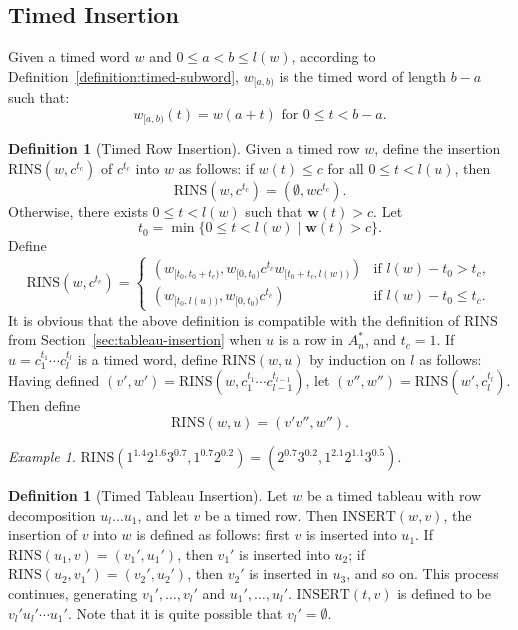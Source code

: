 \documentclass[10pt]{amsproc}
\theoremstyle{definition}
\newtheorem{definition}[theorem]{Definition}
\theoremstyle{remark}
\newtheorem{example}[theorem]{Example}
\newcommand{\rowins}{\mathrm{RINS}}
\newcommand{\ins}{\mathrm{INSERT}}
\begin{document}
\subsection{Timed Insertion}
\label{sec:timed-insertion}
Given a timed word $w$ and $0\leq a < b \leq l(w)$, according to Definition~\ref{definition:timed-subword}, $w_{[a, b)}$ is the timed word of length $b-a$ such that:
\begin{displaymath}
  w_{[a, b)}(t) = w(a+ t) \text{ for } 0\leq t<b-a.
\end{displaymath}
\begin{definition}[Timed Row Insertion]
  \label{definition:timed-row-insertion}
  Given a timed row $w$, define the insertion $\rowins(w, c^{t_c})$ of $c^{t_c}$ into $w$ as follows: if $w(t)\leq c$ for all $0\leq t < l(u)$, then
  \begin{displaymath}
    \rowins(w, c^{t_c}) = (\emptyset, wc^{t_c}).
  \end{displaymath}
  Otherwise, there exists $0\leq t < l(w)$ such that $\mathbf w(t)>c$.
  Let
  \begin{displaymath}
    t_0 = \min\{0\leq t< l(w)\mid \mathbf w(t)> c\}.
  \end{displaymath}
  Define
  \begin{displaymath}
    \rowins(w, c^{t_c}) =
    \begin{cases}
      (w_{[t_0, t_0+t_c)}, w_{[0, t_0)}c^{t_c} w_{[t_0+t_c, l(w))}) & \text{if } l(w) - t_0 > t_c,\\
      (w_{[t_0, l(u))}, w_{[0, t_0)} c^{t_c}) & \text{if } l(w) - t_0 \leq t_c.
    \end{cases}
  \end{displaymath}
  It is obvious that the above definition is compatible with the definition of $\rowins$ from Section~\ref{sec:tableau-insertion} when $u$ is a row in $A_n^*$, and $t_c=1$.
  If $u=c_1^{t_1}\dotsb c_l^{t_l}$ is a timed word, define $\rowins(w,u)$ by induction on $l$ as follows:
  Having defined $(v',w')=\rowins(w,c_1^{t_1}\dotsb c_{l-1}^{t_{l-1}})$,
  let $(v'',w'')=\rowins(w',c_l^{t_l})$.
  Then define
  \begin{displaymath}
    \rowins(w,u) = (v'v'', w'').
  \end{displaymath}
\end{definition}
\begin{example}
  \label{example:timed-row-ins}
  $\rowins(1^{1.4}2^{1.6}3^{0.7},1^{0.7}2^{0.2})=(2^{0.7}3^{0.2},1^{2.1}2^{1.1}3^{0.5})$.
\end{example}
\begin{definition}
  [Timed Tableau Insertion]
  Let $w$ be a timed tableau with row decomposition $u_l\dotsc u_1$, and let $v$ be a timed row.
  Then $\ins(w, v)$, the insertion of $v$ into $w$ is defined as follows:
  first $v$ is inserted into $u_1$.
  If $\rowins(u_1,v)=(v_1',u_1')$, then $v_1'$ is inserted into $u_2$; if $\rowins(u_2,v_1')=(v_2',u_2')$, then $v_2'$ is inserted in $u_3$, and so on.
  This process continues, generating $v_1',\dotsc,v_l'$ and $u_1',\dotsc,u_l'$.
  $\ins(t,v)$ is defined to be $v_l'u_l'\dotsb u_1'$.
  Note that it is quite possible that $v_l'=\emptyset$.
\end{definition}
\end{document}
